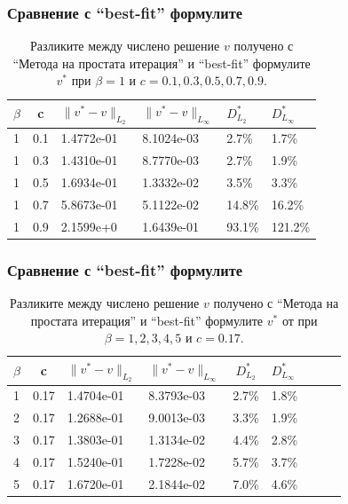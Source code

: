 \documentclass{beamer}
\begin{document}
\begin{frame}
\frametitle{Сравнение с ``best-fit'' формулите}
\begin{table}[ht]
\centering
\begin{tabular}{|l|c|l l|l l|}
\hline 
\hline 
$\beta$	& c 	& $\|v^*-v \|_{L_2 }$ & $\|v^*-v \|_{L_\infty }$  	& $D^*_{L_2}$	& $D^*_{L_\infty }$	\\
\hline 
1& 		0.1	&	1.4772e-01 		& 	8.1024e-03 				& 2.7\%			& 1.7\%		\\
\hline 
1& 		0.3 	&	1.4310e-01 		& 	8.7770e-03				& 2.7\%			& 1.9\%		\\
\hline 
1& 		0.5 	&	1.6934e-01 		& 	1.3332e-02				& 3.5\%			& 3.3\%		\\
\hline 
1& 		0.7 	&	5.8673e-01		& 	5.1122e-02				& 14.8\%		& 16.2\%	\\
\hline 
1& 		0.9	&	2.1599e+0 		& 	1.6439e-01				& 93.1\%		& 121.2\%	\\
\hline 
\hline 
\end{tabular}
\caption{Разликите между числено решение $v$ получено с ``Метода на простата итерация'' и ``best-fit'' формулите $v^*$ при $\beta=1$ и $c=0.1, 0.3, 0.5, 0.7, 0.9$.}
\label{tab:diff-beta1}
\end{table}

\end{frame}

\begin{frame}
\frametitle{Сравнение с ``best-fit'' формулите}
\begin{table}
\centering
\begin{tabular}{|l|c|l l| c|l|c|l l|}
\hline 
\hline 
$\beta$	& c 	& $\|v^*-v \|_{L_2 }$ & $\|v^*-v \|_{L_\infty }$  	& $D^*_{L_2}$	& $D^*_{L_\infty }$	\\
\hline 
1& 		0.17&	1.4704e-01 		& 	8.3793e-03 				& 2.7\%			& 1.8\%		\\
\hline 
2& 		0.17&	1.2688e-01 		& 	9.0013e-03				& 3.3\%			& 1.9\%		\\
\hline 
3& 		0.17&	1.3803e-01 		& 	1.3134e-02				& 4.4\%			& 2.8\%		\\
\hline 
4& 		0.17&	 1.5240e-01 		& 	1.7228e-02				& 5.7\%			& 3.7\%		\\
\hline 
5& 		0.17&	1.6720e-01 		& 	2.1844e-02				& 7.0\%			& 4.6\%		\\
\hline 
\hline 
\end{tabular}
\caption{Разликите между числено решение $v$ получено с ``Метода на простата итерация'' и ``best-fit'' формулите $v^*$ от \cite{Ch2011} при $\beta=1, 2, 3, 4, 5$ и $c=0.17$.}
\label{tab:diff-c017}
\end{table}
\end{frame}
\end{document}
